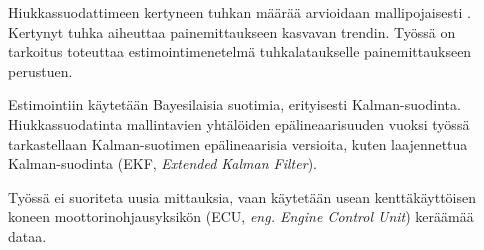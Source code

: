 Hiukkassuodattimeen kertyneen tuhkan määrää arvioidaan mallipojaisesti \cite{??}. 
Kertynyt tuhka aiheuttaa painemittaukseen kasvavan trendin. Työssä on tarkoitus toteuttaa estimointimenetelmä tuhkalataukselle painemittaukseen perustuen.

Estimointiin käytetään Bayesilaisia suotimia, erityisesti Kalman-suodinta. Hiukkassuodatinta mallintavien yhtälöiden epälineaarisuuden vuoksi työssä tarkastellaan Kalman-suotimen epälineaarisia versioita, kuten laajennettua Kalman-suodinta (EKF, \emph{Extended Kalman Filter}).

Työssä ei suoriteta uusia mittauksia, vaan käytetään usean kenttäkäyttöisen koneen moottorinohjausyksikön (ECU, \emph{eng. Engine Control Unit}) keräämää dataa.